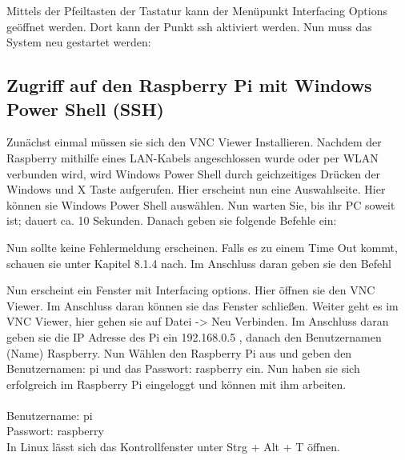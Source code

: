 \medskip


\medskip


Mittels der Pfeiltasten der Tastatur kann der Menüpunkt \glqq Interfacing Options\grqq{} geöffnet werden. Dort
kann der Punkt \glqq ssh\grqq{} aktiviert werden. Nun muss das System neu gestartet werden:

\medskip


\subsection {Zugriff auf den Raspberry Pi mit Windows Power Shell (SSH)}

Zunächst einmal müssen sie sich den VNC Viewer Installieren.
Nachdem der Raspberry mithilfe eines LAN-Kabels angeschlossen wurde oder per WLAN verbunden wird, wird Windows Power Shell durch geichzeitiges Drücken der Windows und X Taste aufgerufen. Hier erscheint nun eine Auswahlseite. Hier können sie Windows Power Shell auswählen. Nun warten Sie, bis ihr PC soweit ist; dauert ca. 10 Sekunden. Danach geben sie folgende Befehle ein:

\medskip


\medskip

Nun sollte keine Fehlermeldung erscheinen. Falls es zu einem Time Out kommt, schauen sie unter Kapitel 8.1.4 nach. Im Anschluss daran geben sie den Befehl

\medskip


\medskip


Nun erscheint ein Fenster mit Interfacing options. Hier öffnen sie den VNC Viewer.  Im Anschluss daran können sie das Fenster schließen.
Weiter geht es im VNC Viewer, hier gehen sie auf Datei -> Neu Verbinden. Im Anschluss daran geben sie die IP Adresse des Pi ein 192.168.0.5   , danach den Benutzernamen (Name) Raspberry. Nun Wählen den Raspberry Pi aus und geben den Benutzernamen: pi und das Passwort: raspberry ein. Nun haben sie sich erfolgreich im Raspberry Pi eingeloggt und können mit ihm arbeiten.\\
\\
Benutzername: pi\\
Passwort: raspberry\\

In Linux lässt sich das Kontrollfenster unter Strg + Alt + T öffnen.

